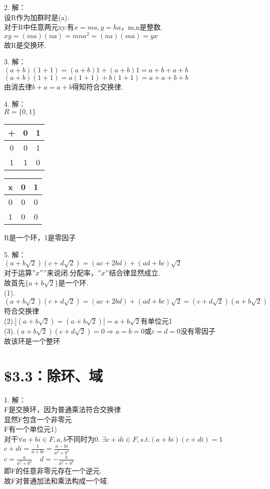 \documentclass{ctexart}
\begin{document}
2.
解：\\
设R作为加群时是(a).\\
对于R中任意两元xy.有$x=ma,y=ha$，m,n是整数.\\
$xy =(ma)(na) = mna^2 =(na)(ma) =yx$ \\
故R是交换环.

3.
解：\\
$(a+b)(1+1)=(a+b)1+(a+b)1=a+b+a+b$\\
$(a+b)(1+1)=a(1+1)+b(1+1)=a+a+b+b$\\
由消去律$b+a=a+b$得知符合交换律.

4.
解：\\
$R=\{0,1\}$
\begin{center}
	\begin{tabular}{c|cc}
		+ & 0 & 1 \\
		\hline
		0 & 0 & 1 \\
		1 & 1 & 0 \\		
	\end{tabular} 
\end{center}
\begin{center}
	\begin{tabular}{c|cc}
		x & 0 & 1 \\
		\hline
		0 & 0 & 0 \\
		1 & 0 & 0 \\		
	\end{tabular} 
\end{center}
R是一个环，1是零因子

5.
解：\\
$(a+b\sqrt{2})(c+d\sqrt{2})=(ac+2bd)+(ad+bc)\sqrt{2}$\\
对于运算$"x"$”来说闭.分配率，$"x"$结合律显然成立.\\
故首先$\{a+b\sqrt{2}\}$是一个环.\\
(1).$(a+b\sqrt{2})(c+d\sqrt{2})=(ac+2bd)+(ad+bc)\sqrt{2}=(c+d\sqrt{2})(a+b\sqrt{2})$符合交换律    \\
(2).$|(a+b\sqrt{2})=(a+b\sqrt{2})|=a+b\sqrt{2}$有单位元1     \\
(3).$(a+b\sqrt{2})(c+d\sqrt{2})=0 \Rightarrow a=b=0$或$c=d=0$没有零因子     \\
故该环是一个整环
\section*{\$3.3：除环、域}
1.
解：\\
F是交换环，因为普通乘法符合交换律\\
显然F包含一个非零元\\
F有一个单位元1)\\
对干$\forall a+bi \in F,a,b$不同时为0.
$\exists c+di \in F,s.t. (a+bi)(c+di)=1$ \\
$c+di=\frac{1}{a+bi}=\frac{a-bi}{a^2+b^2}$ \\
$c=\frac{a}{a^2+b^2} \ \ \ \ \ d=-\frac{b}{a^2+b^2}$\\
即F的任意非零元存在一个逆元. \\
故F对普通加法和乘法构成一个域. 
\end{document}
